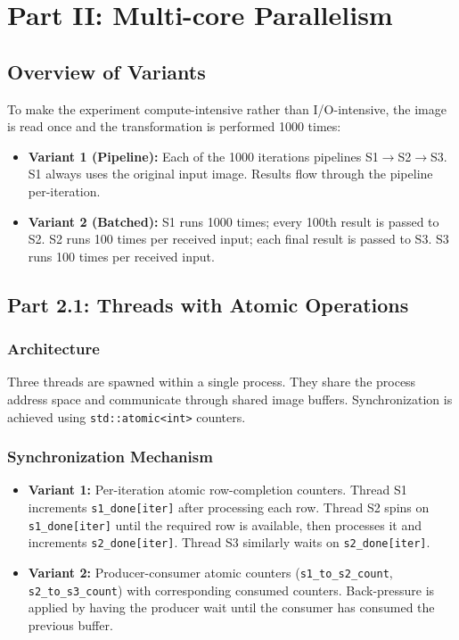 \documentclass[12pt,a4paper]{article}
\begin{document}
\section{Part II: Multi-core Parallelism}

\subsection{Overview of Variants}

To make the experiment compute-intensive rather than I/O-intensive, the image is read once and the transformation is performed 1000 times:

\begin{itemize}
    \item \textbf{Variant 1 (Pipeline):} Each of the 1000 iterations pipelines S1$\to$S2$\to$S3. S1 always uses the original input image. Results flow through the pipeline per-iteration.
    \item \textbf{Variant 2 (Batched):} S1 runs 1000 times; every 100th result is passed to S2. S2 runs 100 times per received input; each final result is passed to S3. S3 runs 100 times per received input.
\end{itemize}

\subsection{Part 2.1: Threads with Atomic Operations}

\subsubsection{Architecture}
Three threads are spawned within a single process. They share the process address space and communicate through shared image buffers. Synchronization is achieved using \texttt{std::atomic<int>} counters.

\subsubsection{Synchronization Mechanism}
\begin{itemize}
    \item \textbf{Variant 1:} Per-iteration atomic row-completion counters. Thread S1 increments \texttt{s1\_done[iter]} after processing each row. Thread S2 spins on \texttt{s1\_done[iter]} until the required row is available, then processes it and increments \texttt{s2\_done[iter]}. Thread S3 similarly waits on \texttt{s2\_done[iter]}.
    \item \textbf{Variant 2:} Producer-consumer atomic counters (\texttt{s1\_to\_s2\_count}, \texttt{s2\_to\_s3\_count}) with corresponding consumed counters. Back-pressure is applied by having the producer wait until the consumer has consumed the previous buffer.
\end{itemize}
\end{document}

